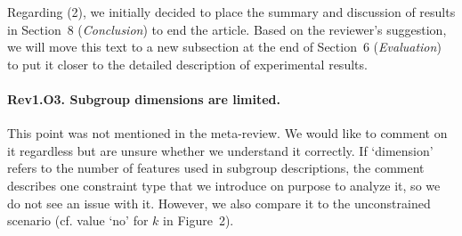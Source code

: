 \documentclass{article}
\begin{document}
Regarding (2), we initially decided to place the summary and discussion of results in Section~8 (\emph{Conclusion}) to end the article.
Based on the reviewer's suggestion, we will move this text to a new subsection at the end of Section~6 (\emph{Evaluation}) to put it closer to the detailed description of experimental results.

\paragraph{Rev1.O3. Subgroup dimensions are limited.}

This point was not mentioned in the meta-review.
We would like to comment on it regardless but are unsure whether we understand it correctly.
If `dimension' refers to the number of features used in subgroup descriptions, the comment describes one constraint type that we introduce on purpose to analyze it, so we do not see an issue with it.
However, we also compare it to the unconstrained scenario (cf. value `no' for $k$ in Figure~2).

\printbibliography
\end{document}

